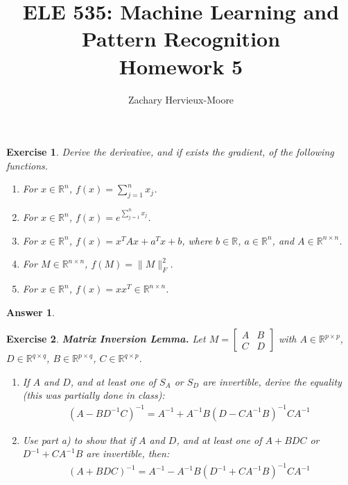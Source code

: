 \documentclass[12pt]{article}
\title{ELE 535: Machine Learning and Pattern Recognition \\ Homework 5}
\author{Zachary Hervieux-Moore}
\date{\displaydate{date}}
\theoremstyle{colon}
\newtheorem{exercise}{Exercise}
\newtheorem*{answer}{Answer}
\begin{document}
\maketitle

\clearpage

\begin{exercise}
  Derive the derivative, and if exists the gradient, of the following functions.

  \begin{enumerate}[label=\alph*)]
    \item For $x \in \mathbb{R}^n$, $f(x) = \sum_{j=1}^n x_j$.
    \item For $x \in \mathbb{R}^n$, $f(x) = e^{\sum_{j=1}^n x_j}$.
    \item For $x \in \mathbb{R}^n$, $f(x) = x^T A x + a^T x + b$, where $b \in \mathbb{R}$, $a \in \mathbb{R}^n$, and $A \in \mathbb{R}^{n \times n}$.
    \item For $M \in \mathbb{R}^{n \times n}$, $f(M) = \lVert M \rVert_F^2$.
    \item For $x \in \mathbb{R}^n$, $f(x) = x x^T \in \mathbb{R}^{n \times n}$.
  \end{enumerate}
\end{exercise}

\begin{answer}
  
\end{answer}

\clearpage

\begin{exercise}
  \textbf{Matrix Inversion Lemma.} Let $M = \begin{bmatrix} A & B \\ C & D \end{bmatrix}$ with $A \in \mathbb{R}^{p \times p}$, $D \in \mathbb{R}^{q \times q}$, $B \in \mathbb{R}^{p \times q}$, $C \in \mathbb{R}^{q \times p}$.

  \begin{enumerate}[label=\alph*)]
    \item If $A$ and $D$, and at least one of $S_A$ or $S_D$ are invertible, derive the equality (this was partially done in class):
      \begin{gather*}
        (A - B D^{-1} C)^{-1} = A^{-1} + A^{-1} B (D - C A^{-1} B)^{-1} C A^{-1}
      \end{gather*}

    \item Use part a) to show that if $A$ and $D$, and at least one of $A + B D C$ or $D^{-1} + C A^{-1} B$ are invertible, then:
      \begin{gather*}
        (A + B D C)^{-1} = A^{-1} - A^{-1} B (D^{-1} + C A^{-1} B)^{-1} C A^{-1}
      \end{gather*}
  \end{enumerate}
\end{exercise}
\end{document}
